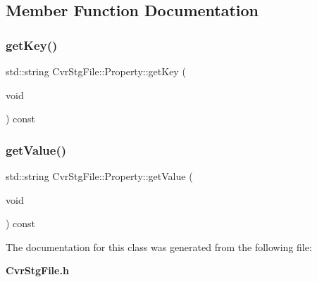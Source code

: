 \subsection{Member Function Documentation}
\mbox{\label{classCvrStgFile_1_1Property_af68b007967b59ec9b6d0de644172be53}} 
\subsubsection{get\+Key()}
{\footnotesize\ttfamily std\+::string Cvr\+Stg\+File\+::\+Property\+::get\+Key (\begin{DoxyParamCaption}\item[{void}]{ }\end{DoxyParamCaption}) const\hspace{0.3cm}{\ttfamily [inline]}}

\mbox{\label{classCvrStgFile_1_1Property_ae3bce21141df6d353e83b1b290e85bdf}} 
\subsubsection{get\+Value()}
{\footnotesize\ttfamily std\+::string Cvr\+Stg\+File\+::\+Property\+::get\+Value (\begin{DoxyParamCaption}\item[{void}]{ }\end{DoxyParamCaption}) const\hspace{0.3cm}{\ttfamily [inline]}}



The documentation for this class was generated from the following file\+:\begin{DoxyCompactItemize}
\item 
\textbf{ Cvr\+Stg\+File.\+h}\end{DoxyCompactItemize}
